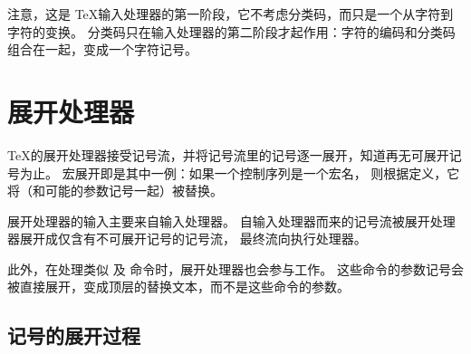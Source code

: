 \documentclass{book}
\begin{document}
注意，这是 \TeX 输入处理器的第一阶段，它不考虑分类码，而只是一个从字符到字符的变换。
分类码只在输入处理器的第二阶段才起作用：字符的编码和分类码组合在一起，变成一个字符记号。

\section{展开处理器}

\TeX 的展开处理器接受记号流，并将记号流里的记号逐一展开，知道再无可展开记号为止。
宏展开即是其中一例：如果一个控制序列是一个宏名，
则根据定义，它将（和可能的参数记号一起）被替换。

展开处理器的输入主要来自输入处理器。
自输入处理器而来的记号流被展开处理器展开成仅含有不可展开记号的记号流，
最终流向执行处理器。

此外，在处理类似  及  命令时，展开处理器也会参与工作。
这些命令的参数记号会被直接展开，变成顶层的替换文本，而不是这些命令的参数。

\subsection{记号的展开过程}
\end{document}
